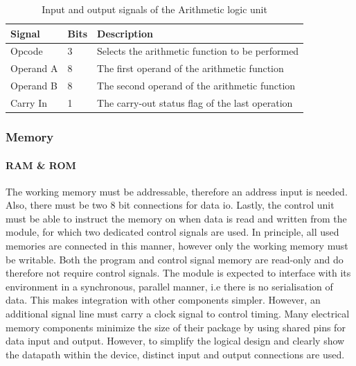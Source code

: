 \begin{table}[H]
    \centering
    \begin{tabular}{|l|l|l|} 
        \hline
        \textbf{\textbf{Signal}} & \textbf{Bits}           & \textbf{Description}                             \\ 
        \hline
        Opcode                   & 3                       & Selects the arithmetic function to be performed  \\ 
        \hline
        Operand A                & 8                       & The first operand of the arithmetic function     \\ 
        \hline
        Operand B                & 8                       & The second operand of the arithmetic function    \\ 
        \hline
        Carry In                 & 1                       & The carry-out status flag of the last operation  \\
        \hline
    \end{tabular}
    \caption{Input and output signals of the Arithmetic logic unit}
    \label{tab:implementation_logical_alu_io}
\end{table}


\subsubsection{Memory}

\paragraph*{RAM \& ROM}

The working memory must be addressable, therefore an address input is needed. Also, there must be two 8 bit connections for data \ac{io}. Lastly, the control unit must be able to instruct the memory on when data is read and written from the module, for which two dedicated control signals are used. In principle, all used memories are connected in this manner, however only the working memory must be writable. Both the program and control signal memory are read-only and do therefore not require control signals. The module is expected to interface with its environment in a synchronous, parallel manner, i.e there is no serialisation of data. This makes integration with other components simpler. However, an additional signal line must carry a clock signal to control timing. Many electrical memory components minimize the size of their package by using shared pins for data input and output. However, to simplify the logical design and clearly show the datapath within the device, distinct input and output connections are used.

